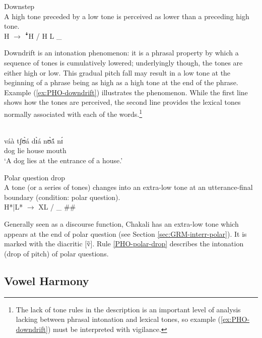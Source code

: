 \begin{Rule}\label{PHO-downstep}{Downstep}\\
A high tone preceded by a low tone is perceived as lower than a preceding high
tone.\\
 H $\rightarrow$  {\T ꜜ}H  / H  L \_
\end{Rule}



Downdrift is an intonation phenomenon: it is a phrasal property by which a 
sequence of tones is cumulatively lowered; underlyingly though, the tones are 
either high or low. This gradual pitch fall may result in a low tone at the 
beginning of a phrase being as high as a high tone at the end of the phrase. 
Example (\ref{ex:PHO-downdrift}) illustrates the phenomenon. While the first 
line shows how the tones are perceived, the second line provides the lexical  
tones normally associated with each of the words.\footnote{The lack of tone 
rules in the  description is an important level of analysis lacking between 
phrasal intonation and lexical tones,  so example 
(\ref{ex:PHO-downdrift}) must 
be interpreted with vigilance.}


\begin{exe}
\ex\label{ex:PHO-downdrift}

 {\T  } {\T  } { \T  } {\T }\\
váà tʃʊ̀á dɪ̀á nʊ̀ã́ nɪ́ \\
dog lie house mouth {\postp} \\
\glt  `A dog lies at the entrance of a house.'
\end{exe}



\begin{Rule}\label{PHO-polar-drop}{Polar question drop}\\
A tone (or a series of tones) changes into an extra-low tone at an
utterance-final boundary (condition:  polar question).\\
H*|L*  $\rightarrow$  XL  /  \_ \#\#
\end{Rule}




Generally seen as a discourse function, Chakali has an extra-low tone  which
appears at the end of  polar question (see Section
\ref{sec:GRM-interr-polar}). It is marked with
the diacritic [v̏]. 
Rule \ref{PHO-polar-drop} describes the intonation (drop of pitch) of  polar
questions.



\subsection{Vowel Harmony}
\label{sec:vowel-harmony}

